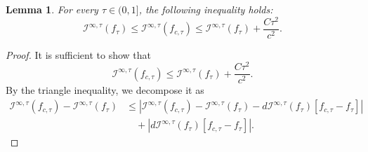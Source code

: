 \documentclass{amsart}
\theoremstyle{plain}
\newtheorem{lemma}[theorem]{Lemma}
\theoremstyle{definition}
\theoremstyle{remark}
\numberwithin{equation}{section} \numberwithin{figure}{section}
\begin{document}
  
      \begin{lemma}\label{new_b}
        For every $\tau \in (0,1]$, the following inequality holds:
        \[
        \mathcal{I}^{\infty,\tau}(f_\tau) \leq \mathcal{I}^{\infty,\tau}(f_{c,\tau}) \leq \mathcal{I}^{\infty,\tau}(f_\tau) + \frac{C\tau^2}{c^2}.
        \]
        \end{lemma}
        
        \begin{proof}
        It is sufficient to show that
        \[
        \mathcal{I}^{\infty,\tau}(f_{c,\tau}) \leq \mathcal{I}^{\infty,\tau}(f_\tau) + \frac{C\tau^2}{c^2}.
        \]
        By the triangle inequality, we decompose it as
        \begin{equation}\label{llp_0}
        \begin{aligned}
        \mathcal{I}^{\infty,\tau}(f_{c,\tau}) - \mathcal{I}^{\infty,\tau}(f_\tau) 
        &\leq \left| \mathcal{I}^{\infty,\tau}(f_{c,\tau}) - \mathcal{I}^{\infty,\tau}(f_\tau) - d\mathcal{I}^{\infty,\tau}(f_\tau)[f_{c,\tau} - f_\tau] \right| \\
        &\quad + \left| d\mathcal{I}^{\infty,\tau}(f_\tau)[f_{c,\tau} - f_\tau] \right|.
        \end{aligned}
        \end{equation}
        

\end{proof}
\end{document}
